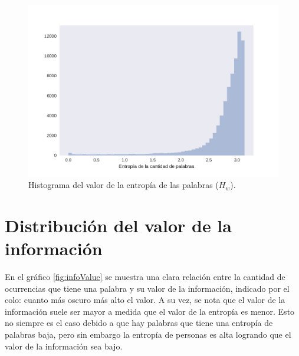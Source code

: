 \begin{figure}[ht]
\centering
\includegraphics[width=1.0\textwidth]{./images/DistribucionEntropia.pdf}
\caption{Histograma del valor de la entropía de las palabras ($H_w$).} 
\label{fig:entropiaPalabras} 
\end{figure}



\section{Distribución del valor de la información}
\label{sec:ValorDeLaInformacion}
En el gráfico \ref{fig:infoValue} se muestra una clara relación entre la cantidad de ocurrencias que tiene una palabra y su valor de la información, indicado por el colo: cuanto más oscuro más alto el valor. A su vez, se nota que el valor de la información suele ser mayor a medida que el valor de la entropía es menor. Esto no siempre es el caso debido a que hay palabras que tiene una entropía de palabras baja, pero sin embargo la entropía de personas es alta logrando que el valor de la información sea bajo.

